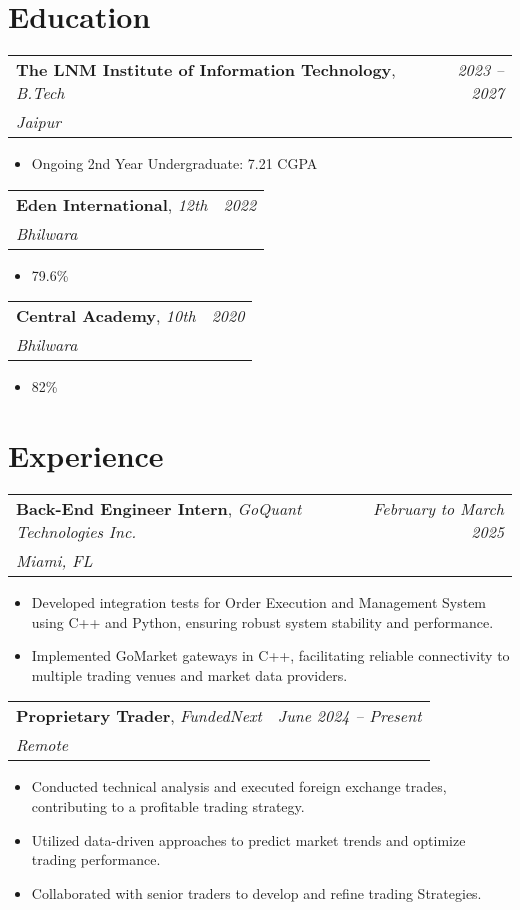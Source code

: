 \documentclass[11pt,a4paper]{article}
\makeatletter
\newcommand{\entrytitle}[1]{\textbf{#1}}
\newcommand{\entryposition}[1]{\textit{#1}}
\newcommand{\entrylocation}[1]{\textit{#1}}
\newcommand{\entrydate}[1]{\textit{#1}}
\newcommand{\entryinfo}[4]{
    \begin{tabularx}{\textwidth}{@{} X r @{}}
        \entrytitle{#1}, \entryposition{#2} & \entrydate{#4} \\
        \entrylocation{#3} & \\
    \end{tabularx}
}
\makeatother
\begin{document}
\section{Education}

\entryinfo{The LNM Institute of Information Technology}{B.Tech}{Jaipur}{2023 -- 2027}
\begin{itemize}[leftmargin=*, nosep]
    \item Ongoing 2nd Year Undergraduate: 7.21 CGPA
\end{itemize}

\entryinfo{Eden International}{12th}{Bhilwara}{2022}
\begin{itemize}[leftmargin=*, nosep]
    \item 79.6\%
\end{itemize}

\entryinfo{Central Academy}{10th}{Bhilwara}{2020}
\begin{itemize}[leftmargin=*, nosep]
    \item 82\%
\end{itemize}

\section{Experience}

\entryinfo{Back-End Engineer Intern}{GoQuant Technologies Inc.}{Miami, FL}{February to March 2025}
\begin{itemize}[leftmargin=*, nosep]
    \item Developed integration tests for Order Execution and Management System using C++ and Python, ensuring robust system stability and performance.
    \item Implemented GoMarket gateways in C++, facilitating reliable connectivity to multiple trading venues and market data providers.
\end{itemize}

\entryinfo{Proprietary Trader}{FundedNext}{Remote}{June 2024 -- Present}
\begin{itemize}[leftmargin=*, nosep]
    \item Conducted technical analysis and executed foreign exchange trades, contributing to a profitable trading strategy.
    \item Utilized data-driven approaches to predict market trends and optimize trading performance.
    \item Collaborated with senior traders to develop and refine trading Strategies.
\end{itemize}
\end{document}
